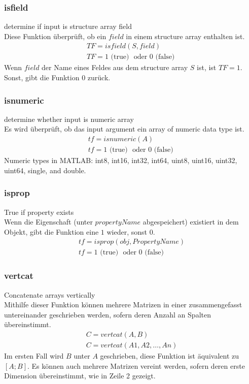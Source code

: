 \documentclass[12pt,bibstyle=none,pagenumberinfooter]{ifmdocument}
\begin{document}
\subsubsection{isfield}
\glqq determine if input is structure array field\grqq{}\\
Diese Funktion \"uberpr\"uft, ob ein $field$ in einem \glqq structure array\grqq{} enthalten ist.
\begin{gather*}
	TF = isfield(S,field)\\
	TF = 1 \text{ (true) } \text{ oder } 0 \text{ (false) }
\end{gather*}
Wenn $field$ der Name eines Feldes aus dem \glqq structure array\grqq{} $S$ ist, ist $TF=1$. Sonst, gibt die Funktion $0$ zur\"uck.
\subsubsection{isnumeric}
\glqq determine whether input is numeric array\grqq{}\\
Es wird \"uberpr\"uft, ob das \glqq input argument\grqq{} ein \glqq array of numeric data type\grqq{} ist.
\begin{gather*}
	tf = isnumeric(A)\\
	tf = 1 \text{ (true) } \text{ oder } 0 \text{ (false) }
\end{gather*}
Numeric types in MATLAB: int8, int16, int32, int64, uint8, uint16, uint32, uint64, single, and double.
\subsubsection{isprop}
\glqq True if property exists\grqq{}\\
Wenn die Eigenschaft (unter $propertyName$ abgespeichert) existiert in dem Objekt, gibt die Funktion eine $1$ wieder, sonst $0$.
\begin{gather*}
	tf = isprop(obj,PropertyName)\\
	tf = 1 \text{ (true) } \text{ oder } 0 \text{ (false) }
\end{gather*}
\subsubsection{vertcat}
\glqq Concatenate arrays vertically\grqq{}\\
Mithilfe dieser Funktion k\"onnen mehrere Matrizen in einer zusammengefasst untereinander geschrieben werden, sofern deren Anzahl an Spalten \"ubereinstimmt. 
\begin{gather*}
	C = vertcat(A,B)\\
	C = vertcat(A1,A2,…,An)
\end{gather*}
Im ersten Fall wird $B$ unter $A$ geschrieben, diese Funktion ist \"aquivalent zu $[A ; B]$. Es k\"onnen auch mehrere Matrizen vereint werden, sofern deren erste Dimension \"ubereinstimmt, wie in Zeile 2 gezeigt.
\end{document}
